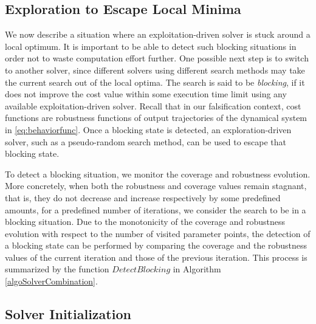 
\subsection{Exploration to Escape Local Minima}
We now describe a situation where an exploitation-driven solver is stuck around a local optimum. It is important to be able to detect such blocking situations in order not to waste computation effort further. One possible next step is to switch to another solver, since different solvers using different search methods may take the current search out of the local optima. The search is said to be {\em blocking}, if it does not improve the cost value within some execution time limit using any available exploitation-driven solver. Recall that in our falsification context, cost functions are robustness functions of output trajectories of the dynamical system in \ref{eq:behaviorfunc}. Once a blocking state is detected, an exploration-driven solver, such as a pseudo-random search method, can be used to escape that blocking state. 

To detect a blocking situation, we monitor the coverage and robustness evolution. More concretely, when both the robustness and coverage values remain stagnant, that is, they do not decrease and increase respectively by some predefined amounts, for a predefined number of iterations, we consider the search to be in a blocking situation. Due to the monotonicity of the coverage and robustness evolution with respect to the number of visited parameter points, the detection of a blocking state can be performed by comparing the coverage and the robustness values of the current iteration and those of the previous iteration. This process is summarized by the function $DetectBlocking$ in Algorithm \ref{algoSolverCombination}.

\subsection{Solver Initialization}\label{sec:init}

